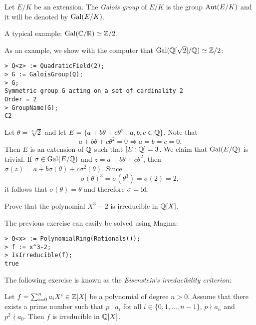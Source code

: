 \begin{definition}
	Let $E/K$ be an extension. The \emph{Galois group}
	of $E/K$ is the group
	$\operatorname{Aut}(E/K)$ and it will be denoted by $\operatorname{Gal}(E/K)$. 
\end{definition}

A typical example: $\operatorname{Gal}(\mathbb{C}/\mathbb{R})\simeq\mathbb{Z}/2$. 

As an example, we show with the computer that $\operatorname{Gal}(\mathbb{Q}[\sqrt{2}]/\mathbb{Q})\simeq\mathbb{Z}/2$:
\begin{lstlisting}
> Q<z> := QuadraticField(2);
> G := GaloisGroup(Q);
> G;
Symmetric group G acting on a set of cardinality 2
Order = 2
> GroupName(G);
C2
\end{lstlisting}

\begin{example}
	Let $\theta=\sqrt[3]{2}$ and let $E=\{a+b\theta+c\theta^2:a,b,c\in\mathbb{Q}\}$. Note that 
\[
	a+b\theta+c\theta^2=0 \Longleftrightarrow a=b=c=0. 
\]
Then $E$ is an extension of $\mathbb{Q}$ such that $[E:\mathbb{Q}]=3$. We claim
that $\operatorname{Gal}(E/\mathbb{Q})$ is trivial. If 
$\sigma\in\operatorname{Gal}(E/\mathbb{Q})$ and $z=a+b\theta+c\theta^2$, then
$\sigma(z)=a+b\sigma(\theta)+c\sigma^2(\theta)$. Since
\[
\sigma(\theta)^3=\sigma(\theta^3)=\sigma(2)=2,
\]
it follows
that $\sigma(\theta)=\theta$ and therefore
$\sigma=\operatorname{id}$. 
\end{example}


\begin{exercise}
\label{xca: X^3-2}
    Prove that the polynomial $X^3-2$ is irreducible in $\mathbb{Q}[X]$.  
\end{exercise}

The previous exercise can easily be solved using
Magma: 
\begin{lstlisting}
> Q<x> := PolynomialRing(Rationals());
> f := x^3-2;
> IsIrreducible(f);
true
\end{lstlisting}

The following exercise is known as the 
\emph{Eisenstein's irreducibility criterion}:
\begin{exercise}
\label{xca:Eisenstein's criterion}
    Let $f=\sum_{i=0}^n a_iX^i\in \mathbb{Z}[X]$ be a polynomial of degree $n>0$. 
    Assume that there exists a prime number such that
    $p\mid a_i$ for all $i\in\{0,1,\dots,n-1\}$, $p\nmid a_n$ and
    $p^2\nmid a_0$. Then $f$ is irreducible in $\mathbb{Q}[X]$. 
\end{exercise}

